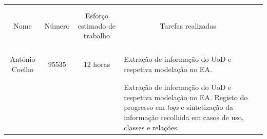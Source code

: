 \documentclass{article}
\begin{document}
    \begin{table}[H]
        \centering
        \begin{tabular}{|l|l|l|l|l}
        \cline{1-4}
        \multicolumn{1}{|l|}{}                   & \multicolumn{1}{l|}{}       & \multicolumn{1}{l|}{}                             & \multicolumn{1}{l|}{}                   &  \\
        \multicolumn{1}{|l|}{}                   & \multicolumn{1}{l|}{}       & \multicolumn{1}{l|}{}                             & \multicolumn{1}{l|}{}                   &  \\
        \multicolumn{1}{|c|}{Nome}               & \multicolumn{1}{c|}{Número} & \multicolumn{1}{c|}{Esforço estimado de trabalho} & \multicolumn{1}{c|}{Tarefas realizadas} &  \\
        \multicolumn{1}{|l|}{}                   & \multicolumn{1}{l|}{}       & \multicolumn{1}{l|}{}                             & \multicolumn{1}{l|}{}                   &  \\
        \multicolumn{1}{|l|}{}                   & \multicolumn{1}{l|}{}       & \multicolumn{1}{l|}{}                             & \multicolumn{1}{l|}{}                   &  \\ \cline{1-4}
        \multicolumn{1}{|l|}{}                   & \multicolumn{1}{l|}{}       & \multicolumn{1}{l|}{}                             & \multirow{5}{7cm}{Extração de informação do UoD e respetiva modelação no EA. }                   &  \\
        \multicolumn{1}{|l|}{}                   & \multicolumn{1}{l|}{}       & \multicolumn{1}{l|}{}                             & \multicolumn{1}{l|}{}                   &  \\
        \multicolumn{1}{|c|}{António Coelho}     & \multicolumn{1}{c|}{95535}  & \multicolumn{1}{c|}{12 horas}                     & \multicolumn{1}{l|}{}                   &  \\
        \multicolumn{1}{|l|}{}                   & \multicolumn{1}{l|}{}       & \multicolumn{1}{l|}{}                             & \multicolumn{1}{l|}{}                   &  \\
        \multicolumn{1}{|l|}{}                   & \multicolumn{1}{l|}{}       & \multicolumn{1}{l|}{}                             & \multicolumn{1}{l|}{}                   & \\ \cline{1-4}
        \multicolumn{1}{|l|}{}                   & \multicolumn{1}{l|}{}       & \multicolumn{1}{l|}{}                             & \multirow{5}{7cm}{Extração de informação do UoD e respetiva modelação no EA. Registo do progresso em \textit{logs} e sintetização da informação recolhida em casos de uso, classes e relações.}                   &   \\

\end{tabular}
\end{table}
\end{document}
